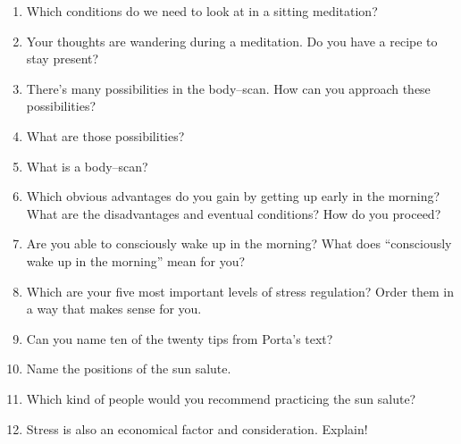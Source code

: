 \documentclass[../main.tex]{subfiles}
\begin{document}
\begin{enumerate}
\item Which conditions do we need to look at in a sitting meditation?
\item Your thoughts are wandering during a meditation. Do you have a recipe to stay present?
\item There's many possibilities in the body--scan. How can you approach these possibilities?
  \item What are those possibilities?
  \item What is a body--scan?
  \item Which obvious advantages do you gain by getting up early in the morning?
    What are the disadvantages and eventual conditions? How do you proceed?
  \item Are you able to consciously wake up in the morning? What does ``consciously wake up in the morning'' mean for you?
    \vspace{4mm}
  \item Which are your five most important levels of stress regulation? Order them in a way that makes sense for you.
  \item Can you name ten of the twenty tips from Porta's text?
    \vspace{4mm}
  \item Name the positions of the sun salute.
  \item Which kind of people would you recommend practicing the sun salute?
    \vspace{4mm}
    \item Stress is also an economical factor and consideration. Explain!
  \end{enumerate}
\end{document}
